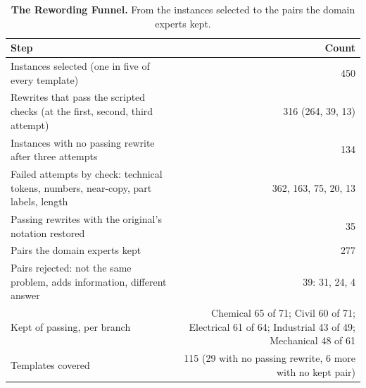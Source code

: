 \begin{table}[t]
\centering
\small
\begin{tabular}{p{} r}
\toprule
\rowcolor{gray!10}
\textbf{Step} & \textbf{Count} \\
\midrule
Instances selected (one in five of every template) & 450 \\
Rewrites that pass the scripted checks (at the first, second, third attempt) & 316 (264, 39, 13) \\
Instances with no passing rewrite after three attempts & 134 \\
Failed attempts by check: technical tokens, numbers, near-copy, part labels, length & 362, 163, 75, 20, 13 \\
Passing rewrites with the original's notation restored & 35 \\
Pairs the domain experts kept & 277 \\
Pairs rejected: not the same problem, adds information, different answer & 39: 31, 24, 4 \\
Kept of passing, per branch & Chemical 65 of 71; Civil 60 of 71; Electrical 61 of 64; Industrial 43 of 49; Mechanical 48 of 61 \\
Templates covered & 115 (29 with no passing rewrite, 6 more with no kept pair) \\
\bottomrule
\end{tabular}
\caption{\textbf{The Rewording Funnel.} From the instances selected to the pairs the domain experts kept.}
\label{tab:rewording_funnel}
\end{table}

